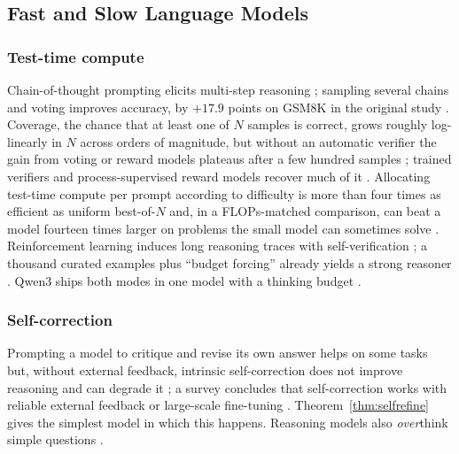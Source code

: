 \subsection{Fast and Slow Language Models}
\label{sec:llmbg}
\subsubsection{Test-time compute}
Chain-of-thought prompting elicits multi-step reasoning \cite{wei2022cot};
sampling several chains and voting improves accuracy, by $+17.9$ points on
GSM8K in the original study \cite{wang2023selfconsistency}. Coverage, the
chance that at least one of $N$ samples is correct, grows roughly
log-linearly in $N$ across orders of magnitude, but without an automatic
verifier the gain from voting or reward models plateaus after a few hundred
samples \cite{brown2024monkeys}; trained verifiers and process-supervised
reward models recover much of it \cite{cobbe2021gsm8k,lightman2024verify}.
Allocating test-time compute per prompt according to difficulty is more than
four times as efficient as uniform best-of-$N$ and, in a FLOPs-matched
comparison, can beat a model fourteen times larger on problems the small
model can sometimes solve \cite{snell2024scaling}. Reinforcement learning
induces long reasoning traces with self-verification
\cite{deepseek2025r1,guo2025deepseekr1nature,openai2024o1}; a thousand
curated examples plus ``budget forcing'' already yields a strong reasoner
\cite{muennighoff2025s1}. Qwen3 ships both modes in one model with a thinking
budget \cite{qwen2025qwen3}.

\subsubsection{Self-correction}
Prompting a model to critique and revise its own answer helps on some tasks
\cite{madaan2023selfrefine,shinn2023reflexion} but, without external
feedback, intrinsic self-correction does not improve reasoning and can degrade
it \cite{huang2024selfcorrect}; a survey concludes that self-correction works
with reliable external feedback or large-scale fine-tuning
\cite{kamoi2024survey}. Theorem~\ref{thm:selfrefine} gives the simplest model
in which this happens. Reasoning models also \emph{over}think simple
questions \cite{chen2024overthinking}.

